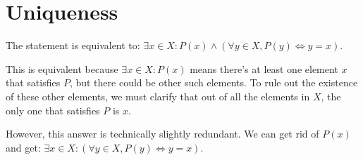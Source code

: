 \documentclass{article}
\begin{document}
\section{Uniqueness}

The statement is equivalent to: $\exists x \in X : P(x) \land (\forall y \in X, P(y) \Leftrightarrow y=x)$.

This is equivalent because $\exists x \in X : P(x)$ means there's at least one element $x$ that satisfies $P$, but there could be other such elements. To rule out the existence of these other elements, we must clarify that out of all the elements in $X$, the only one that satisfies $P$ is $x$.

However, this answer is technically slightly redundant. We can get rid of $P(x)$ and get: $\exists x \in X : (\forall y \in X, P(y) \Leftrightarrow y=x)$.





\end{document}
